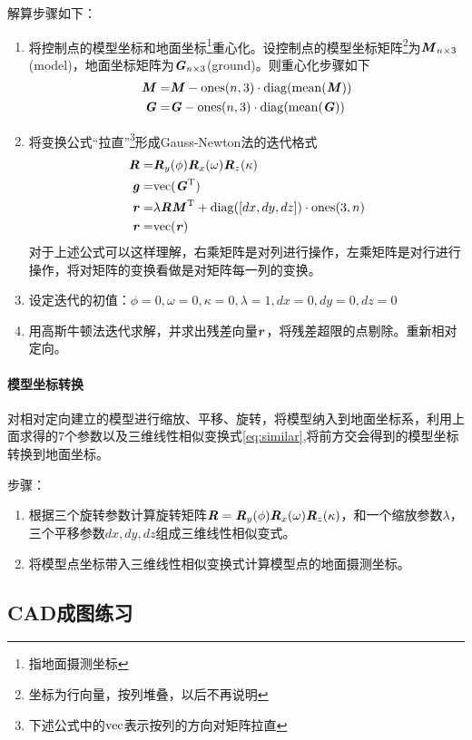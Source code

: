 解算步骤如下：
\begin{enumerate}
\item 将控制点的模型坐标和地面坐标\footnote{指地面摄测坐标}重心化。设控制点的模型坐标矩阵\footnote{坐标为行向量，按列堆叠，以后不再说明}为$\MM_{n\times 3}$(model)，地面坐标矩阵为$\MG_{n\times 3}$(ground)。则重心化步骤如下
\begin{align}
\MM=& \MM-\ones(n,3)\cdot \diag(\mean(\MM)) \\
\MG=& \MG-\ones(n,3)\cdot \diag(\mean(\MG))
\end{align}
\item 将变换公式“拉直”\footnote{下述公式中的$\myvec$表示按列的方向对矩阵拉直}形成Gauss-Newton法的迭代格式
\begin{align*}
\MR=& \MR_y(\phi)\MR_x(\omega)\MR_z(\kappa) \\
\Vg=& \myvec(\MG\myt) \\
\Vr=& \lambda\MR\MM\myt+\diag([dx,dy,dz])\cdot\ones(3,n) \\
\Vr=& \myvec(\Vr)
\end{align*}
对于上述公式可以这样理解，右乘矩阵是对列进行操作，左乘矩阵是对行进行操作，将对矩阵的变换看做是对矩阵每一列的变换。
\item 设定迭代的初值：$\phi=0,\omega=0,\kappa=0,\lambda=1,dx=0,dy=0,dz=0$
\item 用高斯牛顿法迭代求解，并求出残差向量$\Vr$，将残差超限的点剔除。重新相对定向。
\end{enumerate}

\paragraph{模型坐标转换}

对相对定向建立的模型进行缩放、平移、旋转，将模型纳入到地面坐标系，利用上面求得的7个参数以及三维线性相似变换式\ref{eq:similar},将前方交会得到的模型坐标转换到地面坐标。

步骤：
\begin{enumerate}
\item 根据三个旋转参数计算旋转矩阵$\MR=\MR_y(\phi)\MR_x(\omega)\MR_z(\kappa)$，和一个缩放参数$\lambda$，三个平移参数$dx,dy,dz$组成三维线性相似变式。
\item 将模型点坐标带入三维线性相似变换式计算模型点的地面摄测坐标。
\end{enumerate}

\subsection{CAD成图练习}

